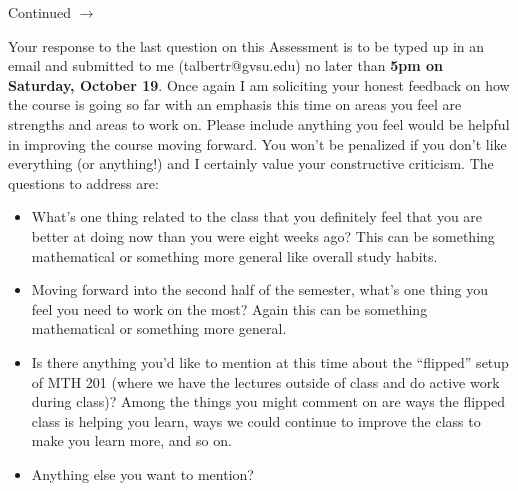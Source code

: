 \documentclass[addpoints]{exam}
\def\pageturn{\vfill
\begin{flushright}
	\begin{small}
		Continued $\rightarrow$
	\end{small}
\end{flushright}
\newpage}
\begin{document}
\begin{questions}
\pageturn

\question[6] Your response to the last question on this Assessment is to be typed up in an email and submitted to me (talbertr@gvsu.edu) no later than \textbf{5pm on Saturday, October 19}. Once again I am  soliciting your honest feedback on how the course is going so far with an emphasis this time on areas you feel are strengths and areas to work on. Please include anything you feel would be helpful in improving the course moving forward. You won't be penalized if you don't like everything (or anything!) and I certainly value your constructive criticism. The questions to address are: 
\begin{itemize}
	\item What's one thing related to the class that you definitely feel that you are better at doing now than you were eight weeks ago? This can be something mathematical or something more general like overall study habits. 
	\item Moving forward into the second half of the semester, what's one thing you feel you need to work on the most? Again this can be something mathematical or something more general. 
	\item Is there anything you'd like to mention at this time about the ``flipped'' setup of MTH 201 (where we have the lectures outside of class and do active work during class)? Among the things you might comment on are ways the flipped class is helping you learn, ways we could continue to improve the class to make you learn more, and so on. 
	\item Anything else you want to mention? 
\end{itemize}

\end{questions}
\end{document}
